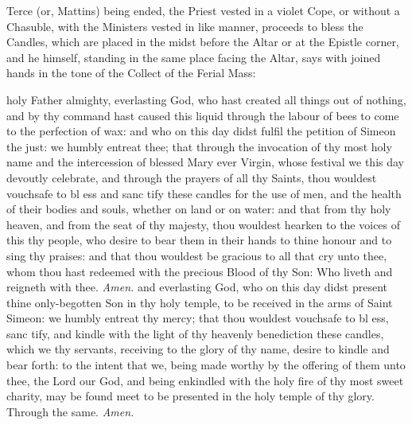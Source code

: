 

\begin{rubric}
    Terce (or, Mattins) being ended, the Priest vested in a violet Cope, or without a Chasuble, with the Ministers vested in like manner, proceeds to bless the Candles, which are placed in the midst before the Altar or at the Epistle corner, and he himself, standing in the same place facing the Altar, says with joined hands in the tone of the Collect of the Ferial Mass:
\end{rubric}
{} holy Father almighty, everlasting God, who hast created all things out of nothing, and by thy command hast caused this liquid through the labour of bees to come to the perfection of wax: and who on this day didst fulfil the petition of Simeon the just: we humbly entreat thee; that through the invocation of thy most holy name and the intercession of blessed Mary ever Virgin, whose festival we this day devoutly celebrate, and through the prayers of all thy Saints, thou wouldest vouchsafe to bl {} ess and sanc {} tify these candles for the use of men, and the health of their bodies and souls, whether on land or on water: and that from thy holy heaven, and from the seat of thy majesty, thou wouldest hearken to the voices of this thy people, who desire to bear them in their hands to thine honour and to sing thy praises: and that thou wouldest be gracious to all that cry unto thee, whom thou hast redeemed with the precious Blood of thy Son: Who liveth and reigneth with thee. \textit{Amen.}
{} and everlasting God, who on this day didst present thine only-begotten Son in thy holy temple, to be received in the arms of Saint Simeon: we humbly entreat thy mercy; that thou wouldest vouchsafe to bl {} ess, sanc {} tify, and kindle with the light of thy heavenly benediction these candles, which we thy servants, receiving to the glory of thy name, desire to kindle and bear forth: to the intent that we, being made worthy by the offering of them unto thee, the Lord our God, and being enkindled with the holy fire of thy most sweet charity, may be found meet to be presented in the holy temple of thy glory. Through the same. \textit{Amen.}
